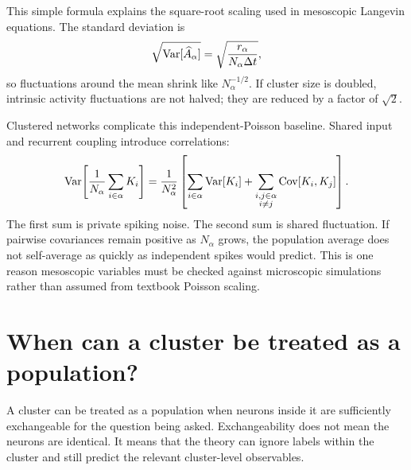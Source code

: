 This simple formula explains the square-root scaling used in mesoscopic Langevin equations. The standard deviation is
%
\begin{equation}
  \sqrt{\operatorname{Var}[\widehat A_\alpha]}
  =
  \sqrt{\frac{r_\alpha}{N_\alpha \Delta t}},
  \label{eq:finite-size-standard-deviation}
\end{equation}
%
so fluctuations around the mean shrink like $N_\alpha^{-1/2}$. If cluster size is doubled, intrinsic activity fluctuations are not halved; they are reduced by a factor of $\sqrt{2}$.

Clustered networks complicate this independent-Poisson baseline. Shared input and recurrent coupling introduce correlations:
%
\begin{equation}
  \operatorname{Var}\!\left[\frac{1}{N_\alpha}\sum_{i\in\alpha} K_i\right]
  =
  \frac{1}{N_\alpha^2}
  \left[
    \sum_{i\in\alpha}\operatorname{Var}[K_i]
    +
    \sum_{\substack{i,j\in\alpha\\i\ne j}}\operatorname{Cov}[K_i,K_j]
  \right].
  \label{eq:population-variance-correlations}
\end{equation}
%
The first sum is private spiking noise. The second sum is shared fluctuation. If pairwise covariances remain positive as $N_\alpha$ grows, the population average does not self-average as quickly as independent spikes would predict. This is one reason mesoscopic variables must be checked against microscopic simulations rather than assumed from textbook Poisson scaling.

\section{When can a cluster be treated as a population?}
\label{sec:when-cluster-treated-population}

A cluster can be treated as a population when neurons inside it are sufficiently exchangeable for the question being asked. Exchangeability does not mean the neurons are identical. It means that the theory can ignore labels within the cluster and still predict the relevant cluster-level observables.

